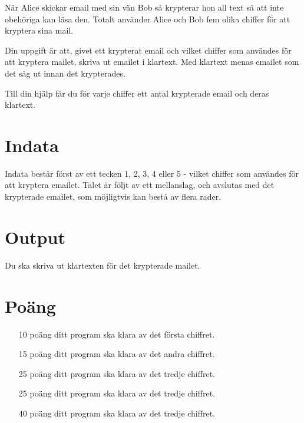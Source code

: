 
När Alice skickar email med sin vän Bob så krypterar hon all text så att inte obehöriga kan läsa den. Totalt använder Alice och Bob fem olika chiffer för att kryptera sina mail.

Din uppgift är att, givet ett krypterat email och vilket chiffer som användes för att kryptera mailet, skriva ut emailet i klartext. Med klartext menas emailet som det såg ut innan det krypterades.

Till din hjälp får du för varje chiffer ett antal krypterade email och deras klartext.

\section*{Indata}
Indata består först av ett tecken 1, 2, 3, 4 eller 5 - vilket chiffer som användes för att kryptera emailet. Talet är följt av ett mellanslag, och avslutas med det krypterade emailet, som möjligtvis kan bestå av flera rader.

\section*{Output}
Du ska skriva ut klartexten för det krypterade mailet.

\section*{Poäng}

\begin{enumerate}
	\item[10 poäng] ditt program ska klara av det första chiffret.
	\item[15 poäng] ditt program ska klara av det andra chiffret.
	\item[25 poäng] ditt program ska klara av det tredje chiffret.
	\item[25 poäng] ditt program ska klara av det tredje chiffret.
	\item[40 poäng] ditt program ska klara av det tredje chiffret.
\end{enumerate}
